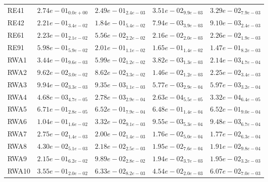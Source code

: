 \documentclass{article}
\begin{document}
\begin{table}
\begin{scriptsize}
\begin{tabular}{lllll}
RE41 & $  2.74e-01_{ 0.0e+00}$ & $  2.49e-01_{ 2.4e-03}$ & \cellcolor{gray25}$  3.51e-02_{ 9.9e-03}$ & \cellcolor{gray95}$  3.29e-02_{ 7.9e-03}$ \\
RE42 & $  2.21e-01_{ 3.4e-02}$ & $  1.84e-01_{ 5.4e-02}$ & \cellcolor{gray95}$  7.94e-03_{ 3.9e-03}$ & \cellcolor{gray25}$  9.10e-03_{ 2.4e-03}$ \\
RE61 & $  2.23e-01_{ 2.1e-02}$ & $  5.56e-02_{ 2.2e-02}$ & \cellcolor{gray95}$  2.16e-02_{ 2.0e-03}$ & \cellcolor{gray25}$  2.26e-02_{ 1.9e-03}$ \\
RE91 & $  5.98e-01_{ 5.9e-02}$ & $  2.01e-01_{ 1.1e-02}$ & \cellcolor{gray25}$  1.65e-01_{ 1.4e-02}$ & \cellcolor{gray95}$  1.47e-01_{ 8.2e-03}$ \\
RWA1 & $  3.44e-01_{ 9.6e-03}$ & $  5.99e-02_{ 1.2e-02}$ & \cellcolor{gray25}$  3.82e-03_{ 1.3e-03}$ & \cellcolor{gray95}$  2.14e-03_{ 4.7e-04}$ \\
RWA2 & $  9.62e-02_{ 3.0e-02}$ & $  8.62e-02_{ 3.3e-02}$ & \cellcolor{gray95}$  1.46e-02_{ 1.2e-03}$ & \cellcolor{gray25}$  2.25e-02_{ 3.4e-03}$ \\
RWA3 & $  9.94e-02_{ 3.3e-03}$ & $  9.35e-03_{ 1.1e-03}$ & \cellcolor{gray95}$  5.77e-03_{ 2.9e-04}$ & \cellcolor{gray25}$  5.97e-03_{ 3.2e-04}$ \\
RWA4 & $  4.68e-03_{ 4.7e-05}$ & $  2.78e-03_{ 2.9e-04}$ & \cellcolor{gray95}$  2.63e-04_{ 5.5e-05}$ & \cellcolor{gray25}$  3.32e-04_{ 6.4e-05}$ \\
RWA5 & $  6.71e-01_{ 2.8e-05}$ & $  6.52e-01_{ 7.9e-04}$ & \cellcolor{gray95}$  6.48e-01_{ 1.4e-04}$ & \cellcolor{gray25}$  6.52e-01_{ 9.0e-04}$ \\
RWA6 & $  1.04e-01_{ 1.6e-02}$ & $  3.32e-02_{ 9.1e-03}$ & \cellcolor{gray25}$  9.55e-03_{ 5.3e-04}$ & \cellcolor{gray95}$  9.48e-03_{ 6.7e-04}$ \\
RWA7 & $  2.75e-02_{ 1.4e-03}$ & $  2.00e-02_{ 1.4e-03}$ & \cellcolor{gray95}$  1.76e-02_{ 5.0e-04}$ & \cellcolor{gray25}$  1.77e-02_{ 6.3e-04}$ \\
RWA8 & $  4.30e-02_{ 5.1e-03}$ & $  2.18e-02_{ 2.5e-03}$ & \cellcolor{gray25}$  1.95e-02_{ 7.6e-04}$ & \cellcolor{gray95}$  1.91e-02_{ 9.8e-04}$ \\
RWA9 & $  2.15e-01_{ 6.2e-02}$ & $  9.89e-02_{ 2.8e-02}$ & \cellcolor{gray95}$  1.94e-02_{ 3.7e-03}$ & \cellcolor{gray25}$  1.95e-02_{ 3.2e-03}$ \\
RWA10 & $  3.55e-01_{ 2.0e-02}$ & $  6.33e-02_{ 8.2e-03}$ & \cellcolor{gray95}$  4.54e-02_{ 2.0e-03}$ & \cellcolor{gray25}$  6.07e-02_{ 7.0e-03}$ \\
\hline
\end{tabular}
\end{scriptsize}
\end{table}
\end{document}
